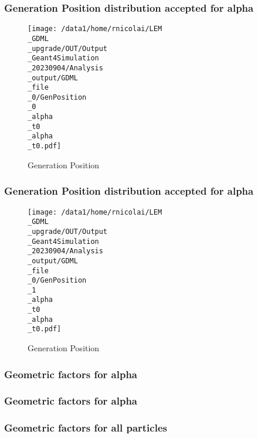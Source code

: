 \documentclass[8pt]{beamer}
\begin{document}
            \begin{frame}
                \frametitle{Generation Position distribution accepted for alpha}
            
        \begin{figure}[h]
            \centering
            \texttt{[image: /data1/home/rnicolai/LEM\\\_GDML\\\_upgrade/OUT/Output\\\_Geant4Simulation\\\_20230904/Analysis\\\_output/GDML\\\_file\\\_0/GenPosition\\\_0\\\_alpha\\\_t0\\\_alpha\\\_t0.pdf]}
            \caption{Generation Position}
        \end{figure}
        
            \end{frame}
            
            \begin{frame}
                \frametitle{Generation Position distribution accepted for alpha}
            
        \begin{figure}[h]
            \centering
            \texttt{[image: /data1/home/rnicolai/LEM\\\_GDML\\\_upgrade/OUT/Output\\\_Geant4Simulation\\\_20230904/Analysis\\\_output/GDML\\\_file\\\_0/GenPosition\\\_1\\\_alpha\\\_t0\\\_alpha\\\_t0.pdf]}
            \caption{Generation Position}
        \end{figure}
        
            \end{frame}
            
            \begin{frame}
                \frametitle{Geometric factors for alpha}
            
            \end{frame}
            
            \begin{frame}
                \frametitle{Geometric factors for alpha}
            
            \end{frame}
            
            \begin{frame}
                \frametitle{Geometric factors for all particles}
            
            \end{frame}
            
        
\end{document}
